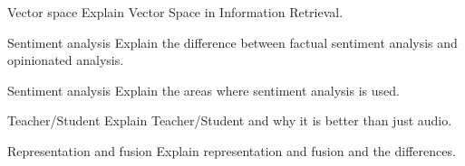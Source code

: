 \documentclass{article}
\begin{document}
\begin{exercise}{Vector space}
  Explain Vector Space in Information Retrieval.

  \begin{solution}
  \end{solution}
\end{exercise}

\begin{exercise}{Sentiment analysis}
  Explain the difference between factual sentiment analysis and opinionated analysis.

  \begin{solution}
  \end{solution}
\end{exercise}

\begin{exercise}{Sentiment analysis}
  Explain the areas where sentiment analysis is used.

  \begin{solution}
  \end{solution}
\end{exercise}

\begin{exercise}{Teacher/Student}
  Explain Teacher/Student and why it is better than just audio.

  \begin{solution}
  \end{solution}
\end{exercise}

\begin{exercise}{Representation and fusion}
  Explain representation and fusion and the differences.

  \begin{solution}
  \end{solution}
\end{exercise}
\end{document}
